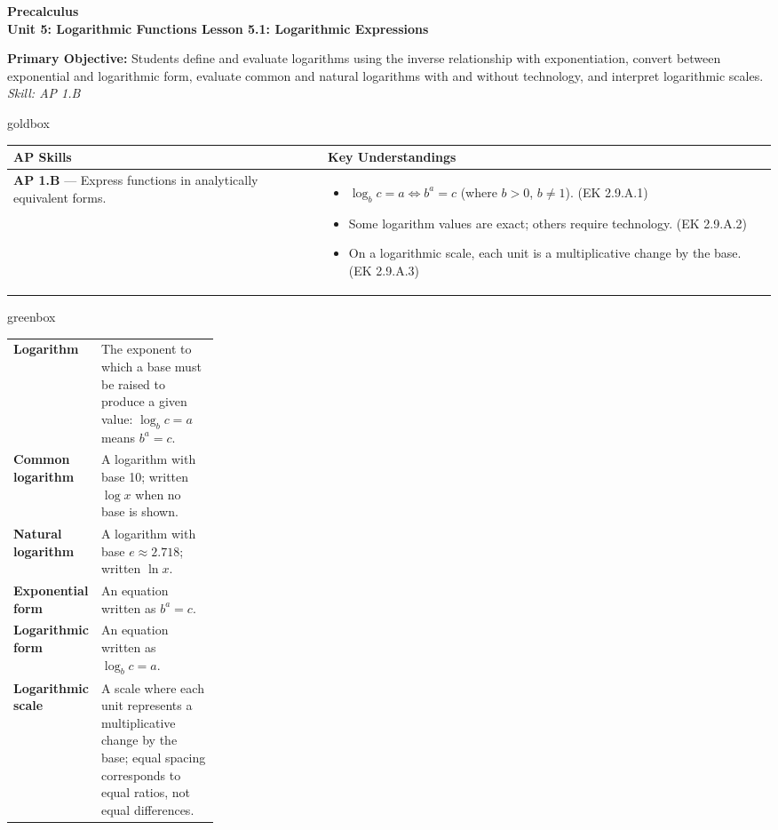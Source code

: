 \documentclass[10pt]{article}
\newcommand{\CourseName}{Precalculus}
\newcommand{\UnitNumberName}{Unit 5: Logarithmic Functions \quad}
\newcommand{\LessonNumberName}{Lesson 5.1: Logarithmic Expressions}
\begin{document}
\begin{center}
    {\Large\bfseries \CourseName \\
    {\small\bfseries \UnitNumberName \LessonNumberName}}
\end{center}

\begin{tcolorbox}[colback=sky, colframe=navy, boxrule=0.9pt, arc=2mm,
    left=2mm, right=2mm, top=1.5mm, bottom=1.5mm]
    \textbf{Primary Objective:} Students define and evaluate logarithms using the inverse
    relationship with exponentiation, convert between exponential and logarithmic form, evaluate
    common and natural logarithms with and without technology, and interpret logarithmic scales.
    \hfill\textit{\small Skill: AP 1.B}
\end{tcolorbox}

\renewcommand{\arraystretch}{1.6}
\begin{skillbox}{goldbox}
\begin{tabularx}{\linewidth}{@{}X X@{}}
\textbf{AP Skills} &
\textbf{Key Understandings} \\
\midrule
\textbf{AP 1.B} --- Express functions in analytically equivalent forms. &
\begin{itemize}[leftmargin=1.2em,itemsep=2pt,topsep=0pt]
  \item $\log_b c = a \Leftrightarrow b^a = c$ (where $b > 0$, $b \ne 1$). (EK 2.9.A.1)
  \item Some logarithm values are exact; others require technology. (EK 2.9.A.2)
  \item On a logarithmic scale, each unit is a multiplicative change by the base. (EK 2.9.A.3)
\end{itemize} \\
\end{tabularx}
\end{skillbox}

\begin{skillbox}{greenbox}
\renewcommand{\arraystretch}{1.4}
\begin{tabularx}{\linewidth}{@{} >{\leavevmode\bfseries\color{navy}}p{0.27\linewidth} X @{}}
Logarithm            & The exponent to which a base must be raised to produce a given value:
                       $\log_b c = a$ means $b^a = c$. \\
Common logarithm     & A logarithm with base 10; written $\log x$ when no base is shown. \\
Natural logarithm    & A logarithm with base $e \approx 2.718$; written $\ln x$. \\
Exponential form     & An equation written as $b^a = c$. \\
Logarithmic form     & An equation written as $\log_b c = a$. \\
Logarithmic scale    & A scale where each unit represents a multiplicative change by the base;
                       equal spacing corresponds to equal ratios, not equal differences. \\
\end{tabularx}
\end{skillbox}
\end{document}
